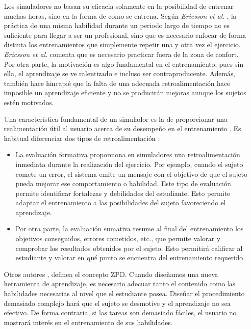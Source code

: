 Los simuladores no basan su eficacia solamente en la posibilidad de entrenar muchas horas, sino en la forma de como se entrena. Según \emph{Ericsson et al.} \cite{ericsson1993role}, la práctica de una misma habilidad durante un periodo largo de tiempo no es suficiente para llegar a ser un profesional, sino que es necesario enfocar de forma distinta los entrenamientos que simplemente repetir una y otra vez el ejercicio. \emph{Ericsson et al.} comenta que es necesario practicar fuera de la zona de confort. Por otra parte, la motivación es algo fundamental en el entrenamiento, pues sin ella, el aprendizaje se ve ralentizado e incluso ser contraproducente. Además, también hace hincapié que la falta de una adecuada retroalimentación hace imposible un aprendizaje eficiente y no se producirán mejoras aunque los sujetos estén motivados. 

Una característica fundamental de un simulador es la de proporcionar una realimentación útil al usuario acerca de su desempeño en el entrenamiento \cite{ericsson1993role}. Es habitual diferenciar dos tipos de retroalimentación \cite{Sando2013}: 
\begin{itemize}
    \item La evaluación formativa proporciona en simuladores una retroalimentación inmediata durante la realización del ejercicio. Por ejemplo, cuando el sujeto comete un error, el sistema emite un mensaje con el objetivo de que el sujeto pueda mejorar ese comportamiento o habilidad. Este tipo de evaluación permite identificar fortalezas y debilidades del estudiante. Esto permite adaptar el entrenamiento a las posibilidades del sujeto favoreciendo el aprendizaje.
    \item Por otra parte, la evaluación sumativa resume al final del entrenamiento los objetivos conseguidos, errores cometidos, etc.,  que permite valorar y comprobar los resultados obtenidos por el sujeto. Esto permitirá calificar al estudiante y valorar en qué punto se encuentra del entrenamiento requerido.
\end{itemize}


Otros autores \cite{zpd}, definen el concepto \ac{ZPD}. Cuando diseñamos una nueva herramienta de aprendizaje, es necesario adecuar tanto el contenido como las habilidades necesarias al nivel que el estudiante posea. Diseñar el procedimiento demasiado complejo hará que el sujeto se desmotive y el aprendizaje no sea efectivo. De forma contraria, si las tareas son demasiado fáciles, el usuario no mostrará interés en el entrenamiento de sus habilidades.


